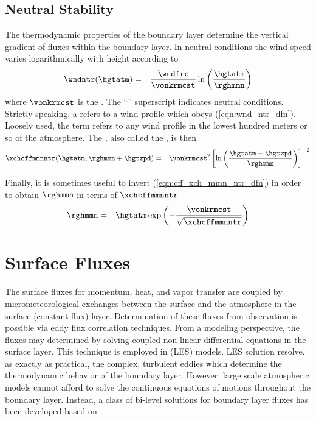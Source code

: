 \documentclass[12pt,twoside]{book}
\begin{document}
\subsection[Neutral Stability]{Neutral Stability}
The thermodynamic properties of the boundary layer determine the
vertical gradient of fluxes within the boundary layer.
In neutral conditions the wind speed varies logarithmically with
height according to
\begin{eqnarray}
\wndntr ( \hgtatm ) & = & 
\frac{\wndfrc}{\vonkrmcst} \ln \left( \frac{\hgtatm}{\rghmmn} \right)
\label{eqn:wnd_ntr_dfn}
\end{eqnarray}
where $\vonkrmcst$ is the .
The ``\ntrsbs'' superscript indicates neutral conditions.
Strictly speaking, a  refers to a
wind profile which obeys (\ref{eqn:wnd_ntr_dfn}).
Loosely used, the term refers to any wind profile in the lowest
hundred meters or so of the atmosphere.
The , also called
the , is then
\begin{eqnarray}
\xchcffmmnntr ( \hgtatm, \rghmmn+\hgtzpd ) & = & 
\vonkrmcst^{2} \left[ \ln \left( \frac{\hgtatm - \hgtzpd}{\rghmmn} \right) \right]^{-2}
\label{eqn:cff_xch_mmn_ntr_dfn}
\end{eqnarray}

Finally, it is sometimes useful to invert
(\ref{eqn:cff_xch_mmn_ntr_dfn}) in order to obtain $\rghmmn$ in terms
of $\xchcffmmnntr$
\begin{eqnarray}
\rghmmn & = & \hgtatm \exp \left( - \frac{\vonkrmcst}{\sqrt { \xchcffmmnntr}} \right)
\label{eqn:rgh_mmn_ntr_dfn}
\end{eqnarray}

\section[Surface Fluxes]{Surface Fluxes}\label{sxn:flx_sfc}
The surface fluxes for momentum, heat, and vapor transfer are
coupled by micrometeorological exchanges between the surface and
the atmosphere in the surface (constant flux) layer.
Determination of these fluxes from observation is possible via eddy
flux correlation techniques.
From a modeling perspective, the fluxes may determined by solving
coupled non-linear differential equations in the surface layer.
This technique is employed in  (LES)
models. 
LES solution resolve, as exactly as practical, the complex, turbulent
eddies which determine the thermodynamic behavior of the boundary
layer. 
However, large scale atmospheric models cannot afford to solve the
continuous equations of motions throughout the boundary layer.
Instead, a class of bi-level solutions for boundary layer fluxes has
been developed based on .
\end{document}

